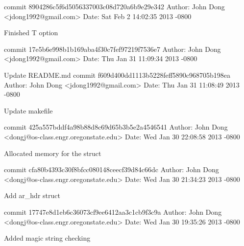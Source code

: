 \documentclass[letterpaper,10pt,titlepage]{article}
\begin{document}
commit 8904286c5f6d5056337003c08d720a6b9e29e342\newline
Author: John Dong <jdong1992@gmail.com>\newline
Date:   Sat Feb 2 14:02:35 2013 -0800\newline

    Finished T option\newline

commit 17e5b6e998b1b169aba4f30c7fef97219f7536e7\newline
Author: John Dong <jdong1992@gmail.com>\newline
Date:   Thu Jan 31 11:09:34 2013 -0800\newline

    Update README.md\newline
\newline
commit f609d400dd1113b5228feff5890c968705b198ea\newline
Author: John Dong <jdong1992@gmail.com>\newline
Date:   Thu Jan 31 11:08:49 2013 -0800\newline

    Update makefile\newline

commit 425a557bddf4a98b88d8c69d65b3b5e2a4546541\newline
Author: John Dong <dongj@os-class.engr.oregonstate.edu>\newline
Date:   Wed Jan 30 22:08:58 2013 -0800\newline

    Allocated memory for the struct\newline

commit cfa80b4393c30f8bfcc080148ceecf39d84c66dc\newline
Author: John Dong <dongj@os-class.engr.oregonstate.edu>\newline
Date:   Wed Jan 30 21:34:23 2013 -0800\newline

    Add ar_hdr struct\newline

commit 17747e8d1eb6c36073cf9ee6412aa3c1cb9f3c9a\newline
Author: John Dong <dongj@os-class.engr.oregonstate.edu>\newline
Date:   Wed Jan 30 19:35:26 2013 -0800\newline

    Added magic string checking\newline
\end{document}
